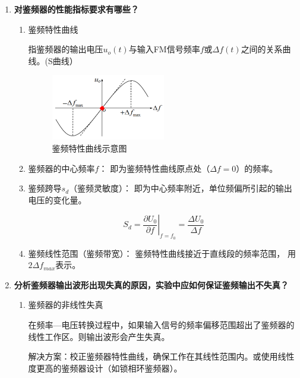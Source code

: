 \documentclass[UTF8]{ctexart}
\begin{document}
\begin{enumerate}
    \item \textbf{对鉴频器的性能指标要求有哪些？}

        \begin{enumerate}
        \item 鉴频特性曲线
        
        指鉴频器的输出电压$u_o(t)$与输入FM信号频率$f$或$\Delta f(t)$之间的关系曲线。(S曲线）
        \begin{figure}[H]
            \centering
            \includegraphics[width=0.5\textwidth]{pics/1.png}
    
            \caption{鉴频特性曲线示意图}\label{fig:1}
        \end{figure}
    
        \item 鉴频器的中心频率$f$：
        即为鉴频特性曲线原点处（$\Delta f=0$）的频率。
    
        \item 鉴频跨导$s_d$（鉴频灵敏度）：
        即为中心频率附近，单位频偏所引起的输出电压的变化量。
        
        $$\left.S_d= \dfrac{\partial U_0}{\partial f}\right|_{f=f_0}=\dfrac{\Delta U_0}{\Delta f}$$
    
        \item 鉴频线性范围（鉴频带宽）：
        鉴频特性曲线接近于直线段的频率范围， 用$2\Delta f_{max}$表示。
        
        \end{enumerate}
    
    \item \textbf{分析鉴频器输出波形出现失真的原因，实验中应如何保证鉴频输出不失真？}
    \begin{enumerate}
        \item 鉴频器的非线性失真
        
        在频率—电压转换过程中，如果输入信号的频率偏移范围超出了鉴频器的线性工作区。则输出波形会产生失真。
        
        解决方案：校正鉴频器特性曲线，确保工作在其线性范围内。或使用线性度更高的鉴频器设计（如锁相环鉴频器）。


\end{enumerate}
\end{enumerate}
\end{document}
